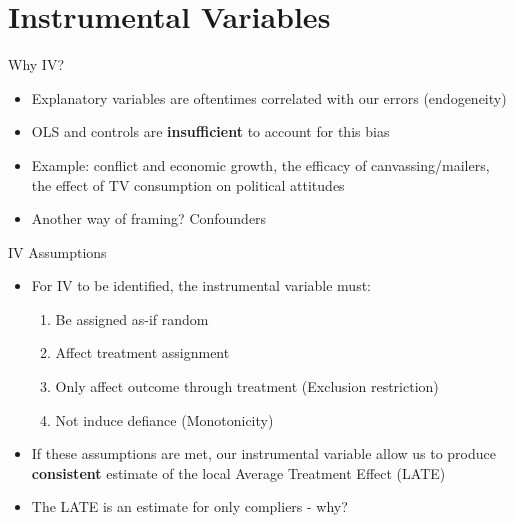 \documentclass[]{beamer}
\begin{document}
\section{Instrumental Variables}

\begin{frame}{Why IV?}

	\begin{itemize}
		\item Explanatory variables are oftentimes correlated with our errors (endogeneity) 
		\item OLS and controls are \textbf{insufficient} to account for this bias 
		\item Example: conflict and economic growth, the efficacy of canvassing/mailers, the effect of TV consumption on political attitudes 
		\item Another way of framing? Confounders 
	\end{itemize}
	
\end{frame}

\begin{frame}{IV Assumptions}

	\begin{itemize}
		\item For IV to be identified, the instrumental variable must: 
	\begin{enumerate}
		\item Be assigned as-if random
		\item Affect treatment assignment
		\item Only affect outcome through treatment (Exclusion restriction)
		\item Not induce defiance (Monotonicity) 
	\end{enumerate}
		\item If these assumptions are met, our instrumental variable allow us to produce \textbf{consistent} estimate of the local Average Treatment Effect (LATE)
		\item The LATE is an estimate for only compliers - why? 
	\end{itemize}
\end{frame}
\end{document}
